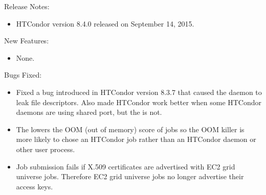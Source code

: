 \noindent Release Notes:

\begin{itemize}

\item HTCondor version 8.4.0 released on September 14, 2015.

\end{itemize}


\noindent New Features:

\begin{itemize}

\item None.

\end{itemize}

\noindent Bugs Fixed:

\begin{itemize}

\item Fixed a bug introduced in HTCondor version 8.3.7 that caused the
 daemon to leak file descriptors.
Also made HTCondor work better when some HTCondor daemons
are using shared port, but the  is not.

\item The  lowers the OOM (out of memory) score of jobs
so the OOM killer is more likely to chose an HTCondor job rather than
an HTCondor daemon or other user process.

\item Job submission fails if X.509 certificates are advertised with EC2 
grid universe jobs.
Therefore EC2 grid universe jobs no longer advertise their access keys.

\end{itemize}

